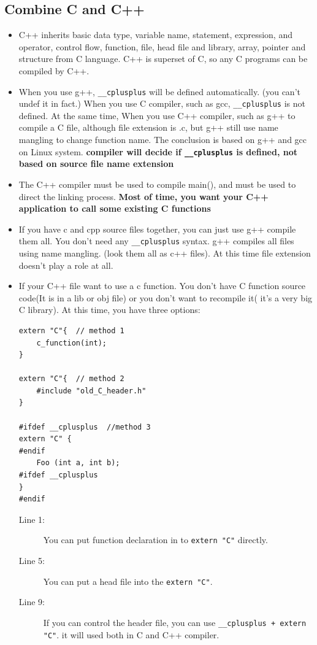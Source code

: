 \documentclass[a4paper,11pt,twoside]{book}
\begin{document}
\subsection{Combine C and C++}
\begin{itemize}
	
	\item C++ inherits basic data type, variable name, statement, expression, and operator, control flow, function, file, head file and library, array, pointer and structure from C language. C++ is superset of C, so any C programs can be compiled by C++.
	
	\item When you use g++,  \texttt{\_\_cplusplus} will be defined automatically. (you can't undef it in fact.) When you use C compiler, such as gcc, \texttt{\_\_cplusplus} is not defined. At the same time, When you use C++ compiler, such as g++ to compile a C file, although file extension is .c, but g++ still use name mangling to change function name.  The conclusion is based on g++ and gcc on Linux system. \textbf{compiler will decide if \texttt{\_\_cplusplus} is defined, not based on source file name extension}
	
	\item The C++ compiler must be used to compile main(), and must be used to direct the linking process. \textbf{Most of time, you want your C++ application to call some existing C functions}
	
	\item If you have c and cpp source files together, you can just use g++ compile them all. You don't need any \texttt{\_\_cplusplus} syntax.  g++ compiles all files using name mangling. (look them all as c++ files). At this time file extension doesn't play a role at all.
	
	\item If your C++ file want to use a c function. You don't have C function source code(It is in a lib or obj file) or you don't want to recompile it( it's a very big C library). At this time, you have three options:
	

\begin{lstlisting}[numbers=none]
extern "C"{  // method 1
	c_function(int);
}
	
extern "C"{  // method 2
	#include "old_C_header.h"
}
	
#ifdef __cplusplus  //method 3
extern "C" {
#endif
	Foo (int a, int b);
#ifdef __cplusplus
}
#endif
\end{lstlisting}
	\begin{description}
	\item[Line 1:] You can put function declaration in to \texttt{extern "C"} directly.
	\item[Line 5:] You can put a head file into the \texttt{extern "C"}.
	\item[Line 9:] If you can control the header file, you can use \texttt{\_\_cplusplus + extern "C"}. it will used both in C and C++ compiler.
\end{description}


\end{itemize}
\end{document}
